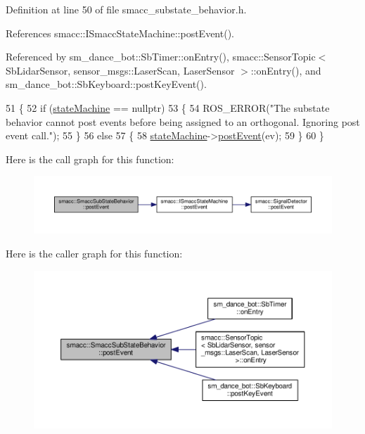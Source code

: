 Definition at line 50 of file smacc\+\_\+substate\+\_\+behavior.\+h.



References smacc\+::\+I\+Smacc\+State\+Machine\+::post\+Event().



Referenced by sm\+\_\+dance\+\_\+bot\+::\+Sb\+Timer\+::on\+Entry(), smacc\+::\+Sensor\+Topic$<$ Sb\+Lidar\+Sensor, sensor\+\_\+msgs\+::\+Laser\+Scan, Laser\+Sensor $>$\+::on\+Entry(), and sm\+\_\+dance\+\_\+bot\+::\+Sb\+Keyboard\+::post\+Key\+Event().


\begin{DoxyCode}
51     \{
52         \textcolor{keywordflow}{if} (\hyperlink{classsmacc_1_1SmaccSubStateBehavior_ae3ff8a316bdd4bc5b7fee59d19464609}{stateMachine} == \textcolor{keyword}{nullptr})
53         \{
54             ROS\_ERROR(\textcolor{stringliteral}{"The substate behavior cannot post events before being assigned to an orthogonal.
       Ignoring post event call."});
55         \}
56         \textcolor{keywordflow}{else}
57         \{
58             \hyperlink{classsmacc_1_1SmaccSubStateBehavior_ae3ff8a316bdd4bc5b7fee59d19464609}{stateMachine}->\hyperlink{classsmacc_1_1ISmaccStateMachine_ad80cdd7bbc9a9f3b221c625754fed1ed}{postEvent}(ev);
59         \}
60     \}
\end{DoxyCode}


Here is the call graph for this function\+:
\nopagebreak
\begin{figure}[H]
\begin{center}
\leavevmode
\includegraphics[width=350pt]{classsmacc_1_1SmaccSubStateBehavior_a8538664f9828247727a27446112788a2_cgraph}
\end{center}
\end{figure}




Here is the caller graph for this function\+:
\nopagebreak
\begin{figure}[H]
\begin{center}
\leavevmode
\includegraphics[width=350pt]{classsmacc_1_1SmaccSubStateBehavior_a8538664f9828247727a27446112788a2_icgraph}
\end{center}
\end{figure}


